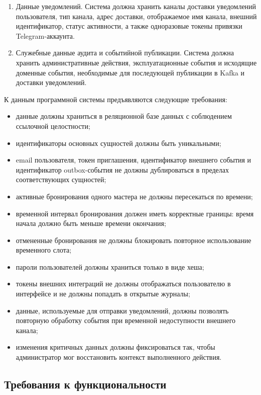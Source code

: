 \begin{enumerate}
\item Данные уведомлений. Система должна хранить каналы доставки уведомлений пользователя, тип канала, адрес доставки, отображаемое имя канала, внешний идентификатор, статус активности, а также одноразовые токены привязки Telegram-аккаунта.
\item Служебные данные аудита и событийной публикации. Система должна хранить административные действия, эксплуатационные события и исходящие доменные события, необходимые для последующей публикации в Kafka и доставки уведомлений.
\end{enumerate}

К данным программной системы предъявляются следующие требования:
\begin{itemize}
\item данные должны храниться в реляционной базе данных с соблюдением ссылочной целостности;
\item идентификаторы основных сущностей должны быть уникальными;
\item email пользователя, токен приглашения, идентификатор внешнего события и идентификатор outbox-события не должны дублироваться в пределах соответствующих сущностей;
\item активные бронирования одного мастера не должны пересекаться по времени;
\item временной интервал бронирования должен иметь корректные границы: время начала должно быть меньше времени окончания;
\item отмененные бронирования не должны блокировать повторное использование временного слота;
\item пароли пользователей должны храниться только в виде хеша;
\item токены внешних интеграций не должны отображаться пользователю в интерфейсе и не должны попадать в открытые журналы;
\item данные, используемые для отправки уведомлений, должны позволять повторную обработку события при временной недоступности внешнего канала;
\item изменения критичных данных должны фиксироваться так, чтобы администратор мог восстановить контекст выполненного действия.
\end{itemize}

\subsection{Требования к функциональности}

